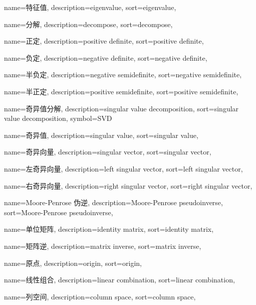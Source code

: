 {
  name=特征值,
  description={eigenvalue},
  sort={eigenvalue},
}

{
  name=分解,
  description={decompose},
  sort={decompose},
}

{
  name=正定,
  description={positive definite},
  sort={positive definite},
}

{
  name=负定,
  description={negative definite},
  sort={negative definite},
}

{
  name=半负定,
  description={negative semidefinite},
  sort={negative semidefinite},
}

{
  name=半正定,
  description={positive semidefinite},
  sort={positive semidefinite},
}

{
  name=奇异值分解,
  description={singular value decomposition},
  sort={singular value decomposition},
  symbol={SVD}
}

{
  name=奇异值,
  description={singular value},
  sort={singular value},
}

{
  name=奇异向量,
  description={singular vector},
  sort={singular vector},
}

{
  name=左奇异向量,
  description={left singular vector},
  sort={left singular vector},
}

{
  name=右奇异向量,
  description={right singular vector},
  sort={right singular vector},
}

{
  name=Moore-Penrose 伪逆,
  description={Moore-Penrose pseudoinverse},
  sort={Moore-Penrose pseudoinverse},
}

{
  name=单位矩阵,
  description={identity matrix},
  sort={identity matrix},
}

{
  name=矩阵逆,
  description={matrix inverse},
  sort={matrix inverse},
}

{
  name=原点,
  description={origin},
  sort={origin},
}

{
  name=线性组合,
  description={linear combination},
  sort={linear combination},
}

{
  name=列空间,
  description={column space},
  sort={column space},
}


